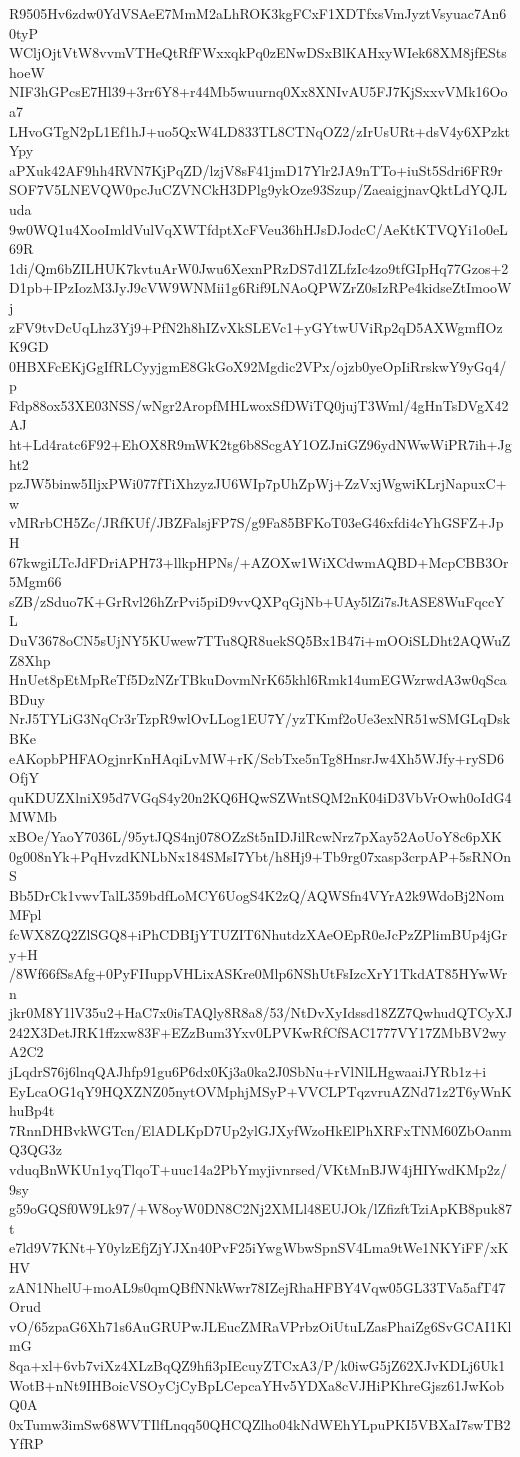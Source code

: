 R9505Hv6zdw0YdVSAeE7MmM2aLhROK3kgFCxF1XDTfxsVmJyztVsyuac7An60tyP
WCljOjtVtW8vvmVTHeQtRfFWxxqkPq0zENwDSxBlKAHxyWIek68XM8jfEStshoeW
NIF3hGPcsE7Hl39+3rr6Y8+r44Mb5wuurnq0Xx8XNIvAU5FJ7KjSxxvVMk16Ooa7
LHvoGTgN2pL1Ef1hJ+uo5QxW4LD833TL8CTNqOZ2/zIrUsURt+dsV4y6XPzktYpy
aPXuk42AF9hh4RVN7KjPqZD/lzjV8sF41jmD17Ylr2JA9nTTo+iuSt5Sdri6FR9r
SOF7V5LNEVQW0pcJuCZVNCkH3DPlg9ykOze93Szup/ZaeaigjnavQktLdYQJLuda
9w0WQ1u4XooImldVulVqXWTfdptXcFVeu36hHJsDJodcC/AeKtKTVQYi1o0eL69R
1di/Qm6bZILHUK7kvtuArW0Jwu6XexnPRzDS7d1ZLfzIc4zo9tfGIpHq77Gzos+2
D1pb+IPzIozM3JyJ9cVW9WNMii1g6Rif9LNAoQPWZrZ0sIzRPe4kidseZtImooWj
zFV9tvDcUqLhz3Yj9+PfN2h8hIZvXkSLEVc1+yGYtwUViRp2qD5AXWgmfIOzK9GD
0HBXFcEKjGgIfRLCyyjgmE8GkGoX92Mgdic2VPx/ojzb0yeOpIiRrskwY9yGq4/p
Fdp88ox53XE03NSS/wNgr2AropfMHLwoxSfDWiTQ0jujT3Wml/4gHnTsDVgX42AJ
ht+Ld4ratc6F92+EhOX8R9mWK2tg6b8ScgAY1OZJniGZ96ydNWwWiPR7ih+Jght2
pzJW5binw5IljxPWi077fTiXhzyzJU6WIp7pUhZpWj+ZzVxjWgwiKLrjNapuxC+w
vMRrbCH5Zc/JRfKUf/JBZFalsjFP7S/g9Fa85BFKoT03eG46xfdi4cYhGSFZ+JpH
67kwgiLTcJdFDriAPH73+llkpHPNs/+AZOXw1WiXCdwmAQBD+McpCBB3Or5Mgm66
sZB/zSduo7K+GrRvl26hZrPvi5piD9vvQXPqGjNb+UAy5lZi7sJtASE8WuFqccYL
DuV3678oCN5sUjNY5KUwew7TTu8QR8uekSQ5Bx1B47i+mOOiSLDht2AQWuZZ8Xhp
HnUet8pEtMpReTf5DzNZrTBkuDovmNrK65khl6Rmk14umEGWzrwdA3w0qScaBDuy
NrJ5TYLiG3NqCr3rTzpR9wlOvLLog1EU7Y/yzTKmf2oUe3exNR51wSMGLqDskBKe
eAKopbPHFAOgjnrKnHAqiLvMW+rK/ScbTxe5nTg8HnsrJw4Xh5WJfy+rySD6OfjY
quKDUZXlniX95d7VGqS4y20n2KQ6HQwSZWntSQM2nK04iD3VbVrOwh0oIdG4MWMb
xBOe/YaoY7036L/95ytJQS4nj078OZzSt5nIDJilRcwNrz7pXay52AoUoY8c6pXK
0g008nYk+PqHvzdKNLbNx184SMsI7Ybt/h8Hj9+Tb9rg07xasp3crpAP+5sRNOnS
Bb5DrCk1vwvTalL359bdfLoMCY6UogS4K2zQ/AQWSfn4VYrA2k9WdoBj2NomMFpl
fcWX8ZQ2ZlSGQ8+iPhCDBIjYTUZIT6NhutdzXAeOEpR0eJcPzZPlimBUp4jGry+H
/8Wf66fSsAfg+0PyFIIuppVHLixASKre0Mlp6NShUtFsIzcXrY1TkdAT85HYwWrn
jkr0M8Y1lV35u2+HaC7x0isTAQly8R8a8/53/NtDvXyIdssd18ZZ7QwhudQTCyXJ
242X3DetJRK1ffzxw83F+EZzBum3Yxv0LPVKwRfCfSAC1777VY17ZMbBV2wyA2C2
jLqdrS76j6lnqQAJhfp91gu6P6dx0Kj3a0ka2J0SbNu+rVlNlLHgwaaiJYRb1z+i
EyLcaOG1qY9HQXZNZ05nytOVMphjMSyP+VVCLPTqzvruAZNd71z2T6yWnKhuBp4t
7RnnDHBvkWGTcn/ElADLKpD7Up2ylGJXyfWzoHkElPhXRFxTNM60ZbOanmQ3QG3z
vduqBnWKUn1yqTlqoT+uuc14a2PbYmyjivnrsed/VKtMnBJW4jHIYwdKMp2z/9sy
g59oGQSf0W9Lk97/+W8oyW0DN8C2Nj2XMLl48EUJOk/lZfizftTziApKB8puk87t
e7ld9V7KNt+Y0ylzEfjZjYJXn40PvF25iYwgWbwSpnSV4Lma9tWe1NKYiFF/xKHV
zAN1NhelU+moAL9s0qmQBfNNkWwr78IZejRhaHFBY4Vqw05GL33TVa5afT47Orud
vO/65zpaG6Xh71s6AuGRUPwJLEucZMRaVPrbzOiUtuLZasPhaiZg6SvGCAI1KlmG
8qa+xl+6vb7viXz4XLzBqQZ9hfi3pIEcuyZTCxA3/P/k0iwG5jZ62XJvKDLj6Uk1
WotB+nNt9IHBoicVSOyCjCyBpLCepcaYHv5YDXa8cVJHiPKhreGjsz61JwKobQ0A
0xTumw3imSw68WVTIlfLnqq50QHCQZlho04kNdWEhYLpuPKI5VBXaI7swTB2YfRP
